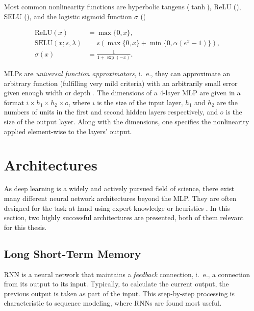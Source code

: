 Most common nonlinearity functions are hyperbolic tangens ($\tanh$), \ac{ReLU} (), \ac{SELU} (), and the logistic sigmoid function $\sigma$ () \cite{Goodfellow-et-al-2016}

\begin{align}
  \text{ReLU}(x) &= \max\{0, x\},\label{eq:relu}\\
  \text{SELU}(x;s,\lambda) &= s (\max\{0,x\} + \min\{0, \alpha(e^x-1)\}), \label{eq:selu}\\
  \sigma (x) &= \frac{1}{1 + \exp (-x)}.\label{eq:logistic_sigmoid}
\end{align}

\acp{MLP} are \emph{universal function approximators}, i.\ e., they can approximate an arbitrary function (fulfilling very mild criteria) with an arbitrarily small error given enough width or depth \cite{Goodfellow-et-al-2016}.
The dimensions of a 4-layer \ac{MLP} are given in a format $i \times h_1 \times h_2 \times o$, where $i$ is the size of the input layer, $h_1$ and $h_2$ are the numbers of units in the first and second hidden layers respectively, and $o$ is the size of the output layer. Along with the dimensions, one specifies the nonlinearity applied element-wise to the layers' output.

\section*{Architectures}

As deep learning is a widely and actively pursued field of science, there exist many different neural network architectures beyond the \ac{MLP}. They are often designed for the task at hand using expert knowledge or heuristics \cite{Goodfellow-et-al-2016}. In this section, two highly successful architectures are presented, both of them relevant for this thesis.

\subsection*{Long Short-Term Memory}

\Ac{RNN} is a neural network that maintains a \emph{feedback} connection, i.\ e., a connection from its output to its input. Typically, to calculate the current output, the previous output is taken as part of the input. This step-by-step processing is characteristic to sequence modeling, where \acp{RNN} are found most useful.

